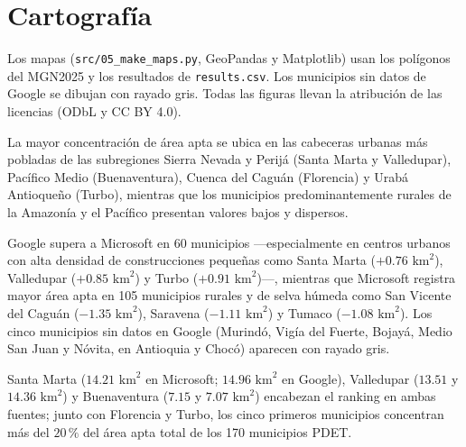 \section{Cartografía}\label{sec:mapas}
Los mapas (\texttt{src/05\_make\_maps.py}, GeoPandas y Matplotlib) usan los polígonos del MGN2025 y los resultados de \texttt{results.csv}. Los municipios sin datos de Google se dibujan con rayado gris. Todas las figuras llevan la atribución de las licencias (ODbL y CC BY 4.0).


La mayor concentración de área apta se ubica en las cabeceras urbanas más pobladas de las subregiones Sierra Nevada y Perijá (Santa Marta y Valledupar), Pacífico Medio (Buenaventura), Cuenca del Caguán (Florencia) y Urabá Antioqueño (Turbo), mientras que los municipios predominantemente rurales de la Amazonía y el Pacífico presentan valores bajos y dispersos.


Google supera a Microsoft en 60 municipios —especialmente en centros urbanos con alta densidad de construcciones pequeñas como Santa Marta ($+0.76\text{ km}^2$), Valledupar ($+0.85\text{ km}^2$) y Turbo ($+0.91\text{ km}^2$)—, mientras que Microsoft registra mayor área apta en 105 municipios rurales y de selva húmeda como San Vicente del Caguán ($-1.35\text{ km}^2$), Saravena ($-1.11\text{ km}^2$) y Tumaco ($-1.08\text{ km}^2$). Los cinco municipios sin datos en Google (Murindó, Vigía del Fuerte, Bojayá, Medio San Juan y Nóvita, en Antioquia y Chocó) aparecen con rayado gris.



Santa Marta ($14.21\text{ km}^2$ en Microsoft; $14.96\text{ km}^2$ en Google), Valledupar ($13.51$ y $14.36\text{ km}^2$) y Buenaventura ($7.15$ y $7.07\text{ km}^2$) encabezan el ranking en ambas fuentes; junto con Florencia y Turbo, los cinco primeros municipios concentran más del $20\,\%$ del área apta total de los 170 municipios PDET.
